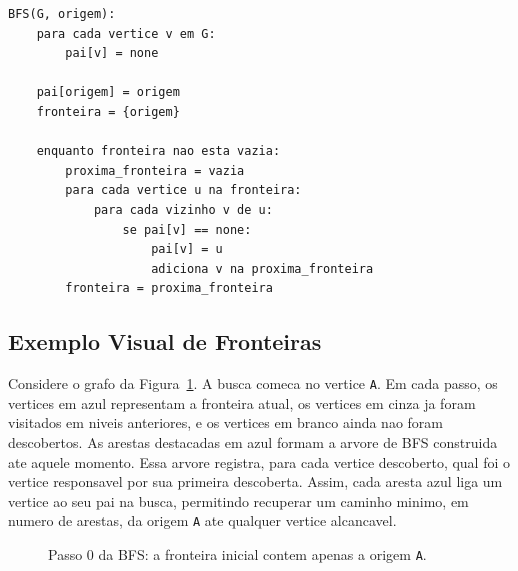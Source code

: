 \documentclass{article}
\begin{document}
\begin{lstlisting}
BFS(G, origem):
    para cada vertice v em G:
        pai[v] = none

    pai[origem] = origem
    fronteira = {origem}

    enquanto fronteira nao esta vazia:
        proxima_fronteira = vazia
        para cada vertice u na fronteira:
            para cada vizinho v de u:
                se pai[v] == none:
                    pai[v] = u
                    adiciona v na proxima_fronteira
        fronteira = proxima_fronteira
\end{lstlisting}

\subsection{Exemplo Visual de Fronteiras}

Considere o grafo da Figura~\ref{fig:bfs-step0}. A busca comeca no vertice
\texttt{A}. Em cada passo, os vertices em azul representam a fronteira atual,
os vertices em cinza ja foram visitados em niveis anteriores, e os vertices em
branco ainda nao foram descobertos. As arestas destacadas em azul formam a
arvore de BFS construida ate aquele momento. Essa arvore registra, para cada
vertice descoberto, qual foi o vertice responsavel por sua primeira descoberta.
Assim, cada aresta azul liga um vertice ao seu pai na busca, permitindo recuperar
um caminho minimo, em numero de arestas, da origem \texttt{A} ate qualquer
vertice alcancavel.

\begin{figure}[H]
\centering
{}
\caption{Passo 0 da BFS: a fronteira inicial contem apenas a origem \texttt{A}.}
\label{fig:bfs-step0}
\end{figure}
\end{document}

